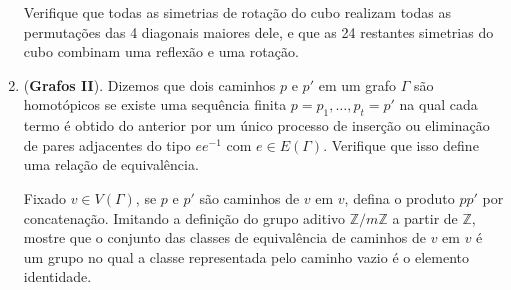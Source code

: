 \documentclass[a4paper,12pt]{article}
\begin{document}
\begin{enumerate}[label=8.\arabic*.]
    Verifique que todas as simetrias de rotação do cubo realizam todas as permutações das 4 diagonais maiores dele, e que as 24 restantes simetrias do cubo combinam uma reflexão e uma rotação. 

    \item (\textbf{Grafos II}). Dizemos que dois caminhos $p$ e $p'$ em um grafo $\Gamma$ são homotópicos se existe uma sequência finita $p = p_1, \ldots, p_t = p'$ na qual cada termo é obtido do anterior por um único processo de inserção ou eliminação de pares adjacentes do tipo $ee^{-1}$ com $e \in E(\Gamma)$. Verifique que isso define uma relação de equivalência. 

    Fixado $v \in V(\Gamma)$, se $p$ e $p'$ são caminhos de $v$ em $v$, defina o produto $pp'$ por concatenação. Imitando a definição do grupo aditivo $\mathbb{Z}/m\mathbb{Z}$ a partir de $\mathbb{Z}$, mostre que o conjunto das classes de equivalência de caminhos de $v$ em $v$ é um grupo no qual a classe representada pelo caminho vazio é o elemento identidade. 

\end{enumerate}
\end{document}
